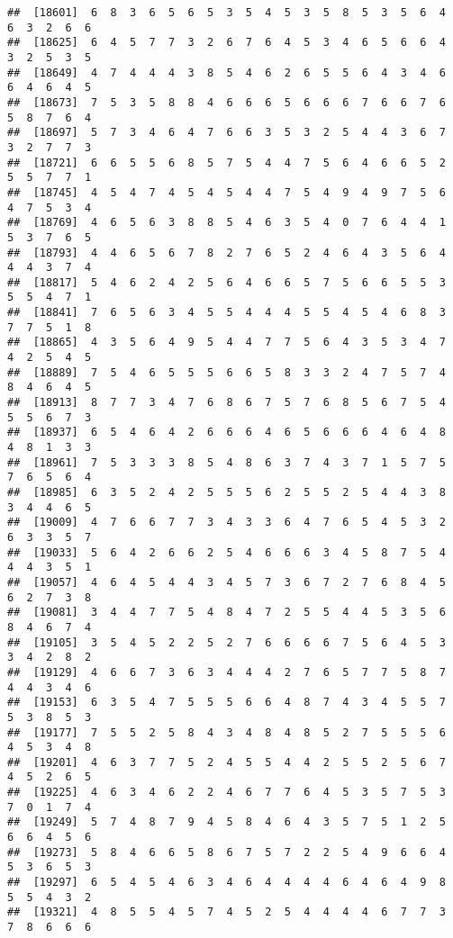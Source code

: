 \documentclass[
]{book}
\begin{document}
\begin{verbatim}
##  [18601]  6  8  3  6  5  6  5  3  5  4  5  3  5  8  5  3  5  6  4  6  3  2  6  6
##  [18625]  6  4  5  7  7  3  2  6  7  6  4  5  3  4  6  5  6  6  4  3  2  5  3  5
##  [18649]  4  7  4  4  4  3  8  5  4  6  2  6  5  5  6  4  3  4  6  6  4  6  4  5
##  [18673]  7  5  3  5  8  8  4  6  6  6  5  6  6  6  7  6  6  7  6  5  8  7  6  4
##  [18697]  5  7  3  4  6  4  7  6  6  3  5  3  2  5  4  4  3  6  7  3  2  7  7  3
##  [18721]  6  6  5  5  6  8  5  7  5  4  4  7  5  6  4  6  6  5  2  5  5  7  7  1
##  [18745]  4  5  4  7  4  5  4  5  4  4  7  5  4  9  4  9  7  5  6  4  7  5  3  4
##  [18769]  4  6  5  6  3  8  8  5  4  6  3  5  4  0  7  6  4  4  1  5  3  7  6  5
##  [18793]  4  4  6  5  6  7  8  2  7  6  5  2  4  6  4  3  5  6  4  4  4  3  7  4
##  [18817]  5  4  6  2  4  2  5  6  4  6  6  5  7  5  6  6  5  5  3  5  5  4  7  1
##  [18841]  7  6  5  6  3  4  5  5  4  4  4  5  5  4  5  4  6  8  3  7  7  5  1  8
##  [18865]  4  3  5  6  4  9  5  4  4  7  7  5  6  4  3  5  3  4  7  4  2  5  4  5
##  [18889]  7  5  4  6  5  5  5  6  6  5  8  3  3  2  4  7  5  7  4  8  4  6  4  5
##  [18913]  8  7  7  3  4  7  6  8  6  7  5  7  6  8  5  6  7  5  4  5  5  6  7  3
##  [18937]  6  5  4  6  4  2  6  6  6  4  6  5  6  6  6  4  6  4  8  4  8  1  3  3
##  [18961]  7  5  3  3  3  8  5  4  8  6  3  7  4  3  7  1  5  7  5  7  6  5  6  4
##  [18985]  6  3  5  2  4  2  5  5  5  6  2  5  5  2  5  4  4  3  8  3  4  4  6  5
##  [19009]  4  7  6  6  7  7  3  4  3  3  6  4  7  6  5  4  5  3  2  6  3  3  5  7
##  [19033]  5  6  4  2  6  6  2  5  4  6  6  6  3  4  5  8  7  5  4  4  4  3  5  1
##  [19057]  4  6  4  5  4  4  3  4  5  7  3  6  7  2  7  6  8  4  5  6  2  7  3  8
##  [19081]  3  4  4  7  7  5  4  8  4  7  2  5  5  4  4  5  3  5  6  8  4  6  7  4
##  [19105]  3  5  4  5  2  2  5  2  7  6  6  6  6  7  5  6  4  5  3  3  4  2  8  2
##  [19129]  4  6  6  7  3  6  3  4  4  4  2  7  6  5  7  7  5  8  7  4  4  3  4  6
##  [19153]  6  3  5  4  7  5  5  5  6  6  4  8  7  4  3  4  5  5  7  5  3  8  5  3
##  [19177]  7  5  5  2  5  8  4  3  4  8  4  8  5  2  7  5  5  5  6  4  5  3  4  8
##  [19201]  4  6  3  7  7  5  2  4  5  5  4  4  2  5  5  2  5  6  7  4  5  2  6  5
##  [19225]  4  6  3  4  6  2  2  4  6  7  7  6  4  5  3  5  7  5  3  7  0  1  7  4
##  [19249]  5  7  4  8  7  9  4  5  8  4  6  4  3  5  7  5  1  2  5  6  6  4  5  6
##  [19273]  5  8  4  6  6  5  8  6  7  5  7  2  2  5  4  9  6  6  4  5  3  6  5  3
##  [19297]  6  5  4  5  4  6  3  4  6  4  4  4  4  6  4  6  4  9  8  5  5  4  3  2
##  [19321]  4  8  5  5  4  5  7  4  5  2  5  4  4  4  4  6  7  7  3  7  8  6  6  6

\end{verbatim}
\end{document}
